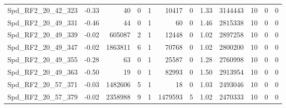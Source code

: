 \begin{longtable}[c]{@{}lrrrrrrrrrrr@{}}
Spd\_RF2\_20\_42\_323         & -0.33                  & 40                      & 0                       & 1                      & 10417                   & 0                       & 1.33                    & 3144443                  & 10                       & 0                        & 0                        \\
Spd\_RF2\_20\_49\_331         & -0.46                  & 44                      & 0                       & 1                      & 60                      & 0                       & 1.46                    & 2815338                  & 10                       & 0                        & 0                        \\
Spd\_RF2\_20\_49\_339         & -0.02                  & 605087                  & 2                       & 1                      & 12448                   & 0                       & 1.02                    & 2897258                  & 10                       & 0                        & 0                        \\
Spd\_RF2\_20\_49\_347         & -0.02                  & 1863811                 & 6                       & 1                      & 70768                   & 0                       & 1.02                    & 2800200                  & 10                       & 0                        & 0                        \\
Spd\_RF2\_20\_49\_355         & -0.28                  & 63                      & 0                       & 1                      & 25587                   & 0                       & 1.28                    & 2760998                  & 10                       & 0                        & 0                        \\
Spd\_RF2\_20\_49\_363         & -0.50                  & 19                      & 0                       & 1                      & 82993                   & 0                       & 1.50                    & 2913954                  & 10                       & 0                        & 0                        \\
Spd\_RF2\_20\_57\_371         & -0.03                  & 1482606                 & 5                       & 1                      & 18                      & 0                       & 1.03                    & 2493046                  & 10                       & 0                        & 0                        \\
Spd\_RF2\_20\_57\_379         & -0.02                  & 2358988                 & 9                       & 1                      & 1479593                 & 5                       & 1.02                    & 2470333                  & 10                       & 0                        & 0                        \\

\end{longtable}
